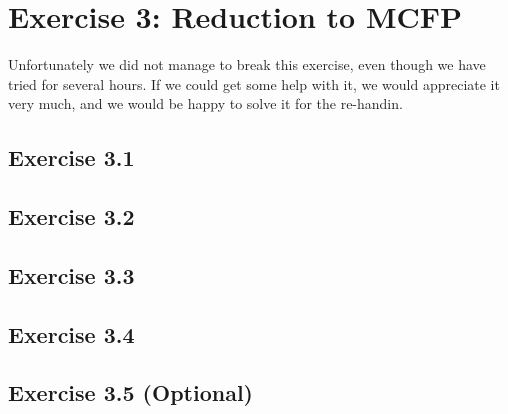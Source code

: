 \section{Exercise 3: Reduction to MCFP}
Unfortunately we did not manage to break this exercise, even though we have tried for several hours.
If we could get some help with it, we would appreciate it very much, and we would be happy to solve 
it for the re-handin. 

\subsection{Exercise 3.1}
\subsection{Exercise 3.2}
\subsection{Exercise 3.3}
\subsection{Exercise 3.4}
\subsection{Exercise 3.5 (Optional)}

